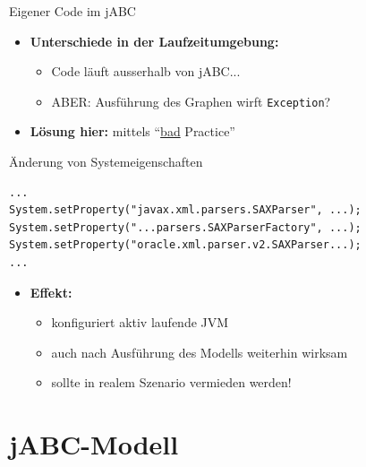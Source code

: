 \begin{frame}[fragile]{Eigener Code im jABC}
\begin{itemize}
	\item \textbf{Unterschiede in der Laufzeitumgebung:} 
	\begin{itemize}
			\item Code läuft ausserhalb von jABC...
			\item ABER: Ausführung des Graphen wirft \texttt{Exception}?
	\end{itemize}
	\pause
	\item \textbf{Lösung hier:} mittels "`\underline{bad} Practice"'
\end{itemize}

\begin{block}{Änderung von Systemeigenschaften}
\javalstset
\begin{lstlisting}
...
System.setProperty("javax.xml.parsers.SAXParser", ...);
System.setProperty("...parsers.SAXParserFactory", ...);
System.setProperty("oracle.xml.parser.v2.SAXParser...);
...
\end{lstlisting}
\end{block}

\begin{itemize}
	\item \textbf{Effekt:}
		\begin{itemize}
			\item konfiguriert aktiv laufende JVM
			\item auch nach Ausführung des Modells weiterhin wirksam
			\item sollte in realem Szenario vermieden werden!
		\end{itemize}
\end{itemize}
\end{frame}


\section{jABC-Modell}

